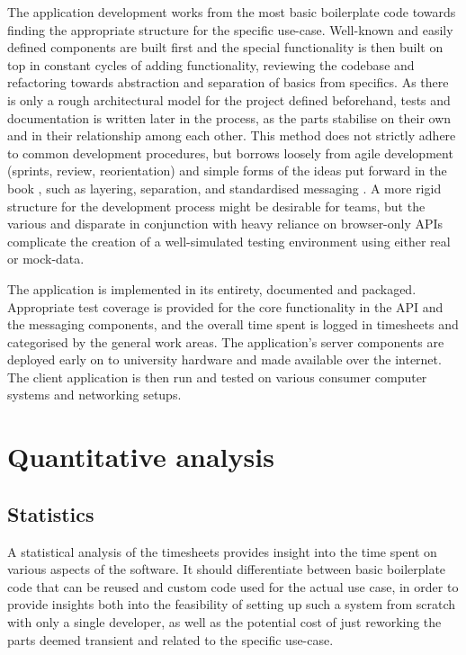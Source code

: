 The application development works from the most basic boilerplate code towards finding the appropriate structure for the specific use-case. Well-known and easily defined components are built first and the special functionality is then built on top in constant cycles of adding functionality, reviewing the codebase and refactoring towards abstraction and separation of basics from specifics. As there is only a rough architectural model for the project defined beforehand, tests and documentation is written later in the process, as the parts stabilise on their own and in their relationship among each other. This method does not strictly adhere to common development procedures, but borrows loosely from agile development (sprints, review, reorientation) and simple forms of the ideas put forward in the book , such as layering, separation, and standardised messaging \parencite{patternOrientedSoftwareArchitecture}. A more rigid structure for the development process might be desirable for teams, but the various and disparate  in conjunction with heavy reliance on browser-only \ac{API}s complicate the creation of a well-simulated testing environment using either real or mock-data.

The application is implemented in its entirety, documented and packaged. Appropriate test coverage is provided for the core functionality in the API and the messaging components, and the overall time spent is logged in timesheets and categorised by the general work areas. The application's server components are deployed early on to university hardware and made available over the internet. The client application is then run and tested on various consumer computer systems and networking setups.

\section{Quantitative analysis}


\subsection{Statistics}

A statistical analysis of the timesheets provides insight into the time spent on various aspects of the software. It should differentiate between basic boilerplate code that can be reused and custom code used for the actual use case, in order to provide insights both into the feasibility of setting up such a system from scratch with only a single developer, as well as the potential cost of just reworking the parts deemed transient and related to the specific use-case.

